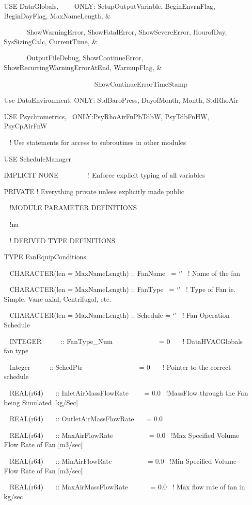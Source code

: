 USE DataGlobals,~~~~ ONLY: SetupOutputVariable, BeginEnvrnFlag, BeginDayFlag, MaxNameLength, \&

~~~~~~ ShowWarningError, ShowFatalError, ShowSevereError, HourofDay, SysSizingCalc, CurrentTime, \&

~~~~~~ OutputFileDebug, ShowContinueError, ShowRecurringWarningErrorAtEnd, WarmupFlag, \&

~ ~~~~~~~~~~~~~~~~~~~~~~~~~ShowContinueErrorTimeStamp

Use DataEnvironment, ONLY: StdBaroPress, DayofMonth, Month, StdRhoAir

USE Psychrometrics,~ ONLY:PsyRhoAirFnPbTdbW, PsyTdbFnHW, PsyCpAirFnW

~ ! Use statements for access to subroutines in other modules

USE ScheduleManager

IMPLICIT NONE~~~~~~~~ ! Enforce explicit typing of all variables

PRIVATE ! Everything private unless explicitly made public

~ !MODULE PARAMETER DEFINITIONS

~ !na

~ ! DERIVED TYPE DEFINITIONS

TYPE FanEquipConditions

~ CHARACTER(len = MaxNameLength) :: FanName~ = `'~ ! Name of the fan

~ CHARACTER(len = MaxNameLength) :: FanType~ = `'~ ! Type of Fan ie. Simple, Vane axial, Centrifugal, etc.

~ CHARACTER(len = MaxNameLength) :: Schedule = `'~ ! Fan Operation Schedule

~ INTEGER ~~~~~:: FanType\_Num~~~~~~~~~~~~~ = 0~~~ ! DataHVACGlobals fan type

~ Integer~~~~~ :: SchedPtr~~~~~~~~~~~~~~~~ = 0~~~ ! Pointer to the correct schedule

~ REAL(r64)~~~ :: InletAirMassFlowRate~~~~ = 0.0~ !MassFlow through the Fan being Simulated {[}kg/Sec{]}

~ REAL(r64)~~~ :: OutletAirMassFlowRate~~~ = 0.0

~ REAL(r64)~~~ :: MaxAirFlowRate~~~~~~~~~~ = 0.0~ !Max Specified Volume Flow Rate of Fan {[}m3/sec{]}

~ REAL(r64)~~~ :: MinAirFlowRate~~~~~~~~~~ = 0.0~ !Min Specified Volume Flow Rate of Fan {[}m3/sec{]}

~ REAL(r64)~~~ :: MaxAirMassFlowRate~~~~~~ = 0.0~ ! Max flow rate of fan in kg/sec

